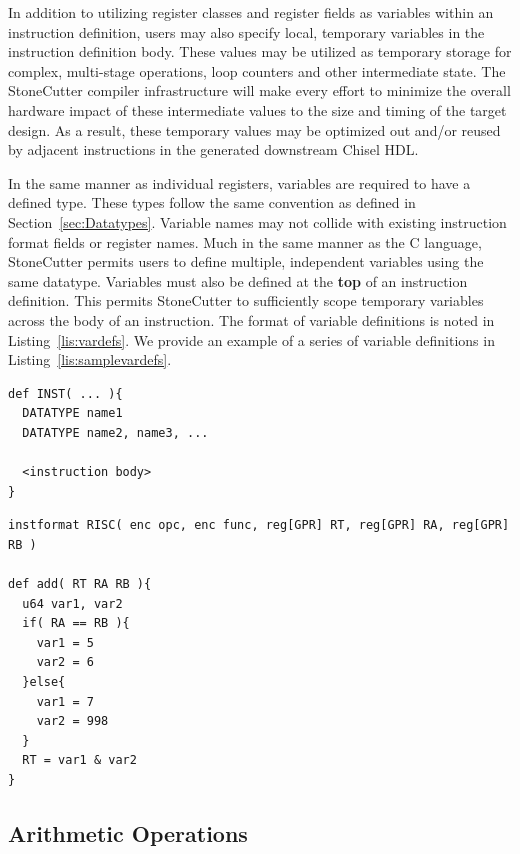 \documentclass{article}
\begin{document}
In addition to utilizing register classes and register fields as variables within 
an instruction definition, users may also specify local, temporary variables 
in the instruction definition body.  These values may be utilized as temporary 
storage for complex, multi-stage operations, loop counters and other intermediate 
state.  The StoneCutter compiler infrastructure will make every effort to minimize the overall 
hardware impact of these intermediate values to the size and timing of the target design.  As a result, 
these temporary values may be optimized out and/or reused by adjacent instructions 
in the generated downstream Chisel HDL.  

In the same manner as individual registers, variables are required to have a defined type.  
These types follow the same convention as defined in Section~\ref{sec:Datatypes}.  Variable 
names may not collide with existing instruction format fields or register names.  Much in the same 
manner as the C language, StoneCutter permits users to define multiple, independent variables 
using the same datatype.  Variables must also be defined at the \textbf{top} of an instruction 
definition.  This permits StoneCutter to sufficiently scope temporary variables across the body 
of an instruction.  The format of 
variable definitions is noted in Listing~\ref{lis:vardefs}.  We provide an example of a series of 
variable definitions in Listing~\ref{lis:samplevardefs}.  

\vspace{0.125in}
\begin{lstlisting}[frame=single,style=base,caption={Variable Definitions},captionpos=b,label={lis:vardefs}]
def INST( ... ){
  DATATYPE name1
  DATATYPE name2, name3, ...

  <instruction body>
}
\end{lstlisting}

\vspace{0.125in}
\begin{lstlisting}[frame=single,style=base,caption={Sample Variable Definitions},captionpos=b,label={lis:samplevardefs}]
instformat RISC( enc opc, enc func, reg[GPR] RT, reg[GPR] RA, reg[GPR] RB )

def add( RT RA RB ){
  u64 var1, var2
  if( RA == RB ){
    var1 = 5
    var2 = 6
  }else{
    var1 = 7
    var2 = 998
  }
  RT = var1 & var2
}
\end{lstlisting}

\clearpage
\subsection{Arithmetic Operations}
\label{sec:Arithmetic Operations}
\end{document}

